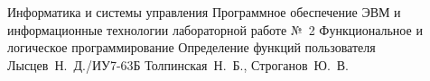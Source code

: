 \documentclass{bmstu}
\begin{document}
\makereporttitle
{Информатика и системы управления} %
{Программное обеспечение ЭВМ и информационные технологии}
{лабораторной работе №~2} %
{Функциональное и логическое программирование} %
{Определение функций пользователя} %
{} %
{Лысцев~Н.~Д./ИУ7-63Б} %
{Толпинская~Н.~Б.,  Строганов~Ю.~В.} %
{}


%

%
%
%

\end{document}

